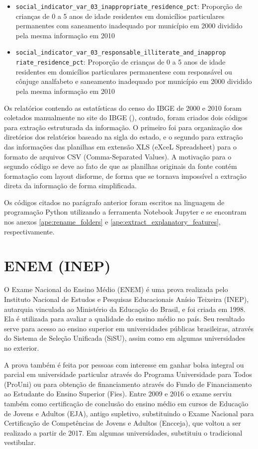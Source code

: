 \begin{itemize}
	\item \verb|social_indicator_var_03_inappropriate_residence_pct|: Proporção de crianças de 0 a 5 anos de idade residentes em domicílios particulares permanentes com saneamento inadequado por município em 2000 dividido pela mesma informação em 2010
	\item \verb|social_indicator_var_03_responsable_illiterate_and_inapprop|\\ \verb|riate_residence_pct|: Proporção de crianças de 0 a 5 anos de idade residentes em domicílios particulares permanentese com responsável ou cônjuge analfabeto e saneamento inadequado por município em 2000 dividido pela mesma informação em 2010
\end{itemize}

Os relatórios contendo as estatísticas do censo do IBGE de 2000 e 2010 foram coletados manualmente no site do IBGE (\citet{IBGE}), contudo, foram criados dois códigos para extração estruturada da informação. O primeiro foi para organização dos diretórios dos relatórios baseado na sigla do estado, e o segundo para extração das informações das planilhas em extensão XLS (eXceL Spreadsheet) para o formato de arquivos CSV (Comma-Separated Values). A motivação para o segundo código se deve ao fato de que as planilhas originais da fonte contém formatação com layout disforme, de forma que se tornava impossível a extração direta da informação de forma simplificada.

Os códigos citados no parágrafo anterior foram escritos na linguagem de programação Python utilizando a ferramenta Notebook Jupyter e se encontram nos anexos \ref{ape:rename_folders} e \ref{ape:extract_explanatory_features}, respectivamente.

\section{ENEM (INEP)}
\label{sec:enem_inep}

O Exame Nacional do Ensino Médio (ENEM) é uma prova realizada pelo Instituto Nacional de Estudos e Pesquisas Educacionais Anísio Teixeira (INEP), autarquia vinculada ao Ministério da Educação do Brasil, e foi criada em 1998. Ela é utilizada para avaliar a qualidade do ensino médio no país. Seu resultado serve para acesso ao ensino superior em universidades públicas brasileiras, através do Sistema de Seleção Unificada (SiSU), assim como em algumas universidades no exterior.

A prova também é feita por pessoas com interesse em ganhar bolsa integral ou parcial em universidade particular através do Programa Universidade para Todos (ProUni) ou para obtenção de financiamento através do Fundo de Financiamento ao Estudante do Ensino Superior (Fies). Entre 2009 e 2016 o exame serviu também como certificação de conclusão do ensino médio em cursos de Educação de Jovens e Adultos (EJA), antigo supletivo, substituindo o Exame Nacional para Certificação de Competências de Jovens e Adultos (Encceja), que voltou a ser realizado a partir de 2017. Em algumas universidades, substituiu o tradicional vestibular.


